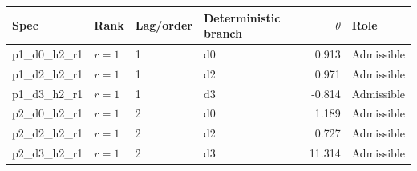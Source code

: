 \begin{tabular}{llllrl}
\toprule
Spec & Rank & Lag/order & Deterministic branch & $\theta$ & Role \\
\midrule
p1\_d0\_h2\_r1 & $r=1$ & 1 & d0 & 0.913 & Admissible \\
p1\_d2\_h2\_r1 & $r=1$ & 1 & d2 & 0.971 & Admissible \\
p1\_d3\_h2\_r1 & $r=1$ & 1 & d3 & -0.814 & Admissible \\
p2\_d0\_h2\_r1 & $r=1$ & 2 & d0 & 1.189 & Admissible \\
p2\_d2\_h2\_r1 & $r=1$ & 2 & d2 & 0.727 & Admissible \\
p2\_d3\_h2\_r1 & $r=1$ & 2 & d3 & 11.314 & Admissible \\
\bottomrule
\end{tabular}
